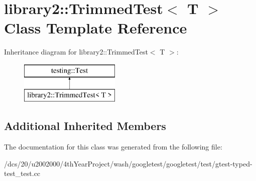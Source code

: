 \hypertarget{classlibrary2_1_1TrimmedTest}{}\section{library2\+:\+:Trimmed\+Test$<$ T $>$ Class Template Reference}
\label{classlibrary2_1_1TrimmedTest}
Inheritance diagram for library2\+:\+:Trimmed\+Test$<$ T $>$\+:\begin{figure}[H]
\begin{center}
\leavevmode
\includegraphics[height=2.000000cm]{classlibrary2_1_1TrimmedTest}
\end{center}
\end{figure}
\subsection*{Additional Inherited Members}


The documentation for this class was generated from the following file\+:\begin{DoxyCompactItemize}
\item 
/dcs/20/u2002000/4th\+Year\+Project/wash/googletest/googletest/test/gtest-\/typed-\/test\+\_\+test.\+cc\end{DoxyCompactItemize}
